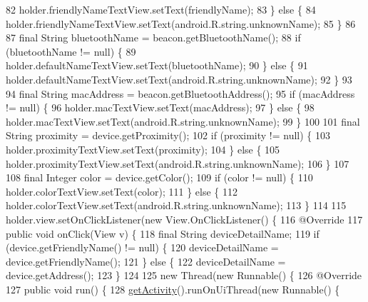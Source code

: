 \begin{DoxyCode}
{{82             holder.friendlyNameTextView.setText(friendlyName);
83         \} \textcolor{keywordflow}{else} \{
84             holder.friendlyNameTextView.setText(android.R.string.unknownName);
85         \}
86 
87         \textcolor{keyword}{final} String bluetoothName = beacon.getBluetoothName();
88         \textcolor{keywordflow}{if} (bluetoothName != null) \{
89             holder.defaultNameTextView.setText(bluetoothName);
90         \} \textcolor{keywordflow}{else} \{
91             holder.defaultNameTextView.setText(android.R.string.unknownName);
92         \}
93 
94         \textcolor{keyword}{final} String macAddress = beacon.getBluetoothAddress();
95         \textcolor{keywordflow}{if} (macAddress != null) \{
96             holder.macTextView.setText(macAddress);
97         \} \textcolor{keywordflow}{else} \{
98             holder.macTextView.setText(android.R.string.unknownName);
99         \}
100 
101         \textcolor{keyword}{final} String proximity = device.getProximity();
102         \textcolor{keywordflow}{if} (proximity != null) \{
103             holder.proximityTextView.setText(proximity);
104         \} \textcolor{keywordflow}{else} \{
105             holder.proximityTextView.setText(android.R.string.unknownName);
106         \}
107 
108         \textcolor{keyword}{final} Integer color = device.getColor();
109         \textcolor{keywordflow}{if} (color != null) \{
110             holder.colorTextView.setText(color);
111         \} \textcolor{keywordflow}{else} \{
112             holder.colorTextView.setText(android.R.string.unknownName);
113         \}
114 
115         holder.view.setOnClickListener(\textcolor{keyword}{new} View.OnClickListener() \{
116             @Override
117             \textcolor{keyword}{public} \textcolor{keywordtype}{void} onClick(View v) \{
118                 \textcolor{keyword}{final} String deviceDetailName;
119                 \textcolor{keywordflow}{if} (device.getFriendlyName() != null) \{
120                     deviceDetailName = device.getFriendlyName();
121                 \} \textcolor{keywordflow}{else} \{
122                     deviceDetailName = device.getAddress();
123                 \}
124 
125                 \textcolor{keyword}{new} Thread(\textcolor{keyword}{new} Runnable() \{
126                     @Override
127                     \textcolor{keyword}{public} \textcolor{keywordtype}{void} run() \{
128                         \hyperlink{classit_1_1unibo_1_1torsello_1_1bluetoothpositioning_1_1adapter_1_1DeviceCardViewAdapter_a0ff32c6bf5d84b68021bf586d64cacaf_a0ff32c6bf5d84b68021bf586d64cacaf}{getActivity}().runOnUiThread(\textcolor{keyword}{new} Runnable() \{
}}
\end{DoxyCode}
